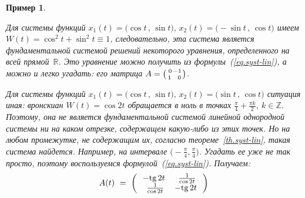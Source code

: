\documentclass[12pt,a4paper]{article}
\newtheorem{ex}{Пример}
\newcommand{\re}{{\mathbb R}}
\newcommand{\z}{{\mathbb Z}}
\begin{document}
\begin{ex}\label{ex.syst-lin1}
{\em Для системы функций
$x_1(t) = \bigl(\cos t\, , \, \sin t \bigr), \, x_2(t) = \bigl(-\sin t\, , \, \cos t \bigr) $
имеем $W(t) = \cos^2 t + \sin^2 t \equiv  1$, следовательно, эта система является
фундаментальной системой решений некоторого уравнения, определенного на всей прямой~$\re$.
Это уравнение можно получить из формулы~(\ref{eq.syst-lin}), а можно и легко угадать:
его матрица $A = \bigl({\, 0\,  -1\atop 1\, \  \ 0 }\bigr)$.

 Для системы функций
 $x_1(t) = \bigl(\cos t\, , \, \sin t \bigr), \, x_2(t) = \bigl(\sin t\, , \, \cos t \bigr) $
 ситуация иная: вронскиан $W(t) = \cos 2t$ обращается в ноль в точках $\frac{\pi}{4} + \frac{\pi k}{2}, \ k \in \z$.
 Поэтому, она не является фундаментальной системой линейной однородной системы ни на каком отрезке,
 содержащем какую-либо из этих точек. Но на любом промежутке, не содержащим их, согласно
теореме~\ref{th.syst-lin}, такая система найдется. Например, на интервале $\bigl(-\frac{\pi}{4}, \frac{\pi}{4} \bigr)$.
 Угадать ее уже не так просто,
поэтому воспользуемся формулой~(\ref{eq.syst-lin}). Получаем:
$$
A(t) \ = \
\left(\,
\begin{array}{cc}
- {\rm tg}\, 2t\, & \, \frac{1}{\cos 2t}\\
\, \frac{1}{\cos 2t} & - {\rm tg}\, 2t\,
\end{array}
\right)
$$
}
\end{ex}
\bigskip
\end{document}
